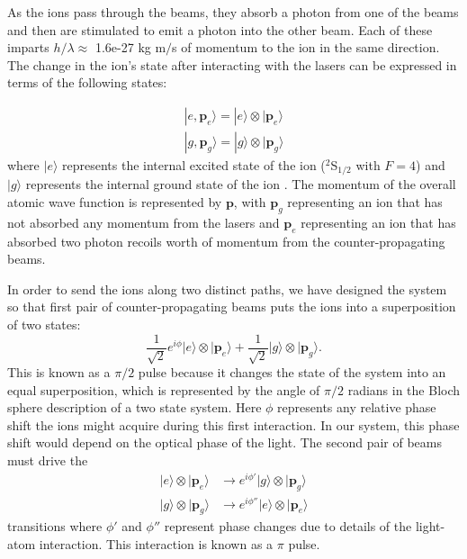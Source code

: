 As the ions pass through the beams, they absorb a photon from one of the beams and then are stimulated to emit a photon into the other beam. Each of these imparts $h/\lambda\approx$ 1.6e-27 kg m$/$s of momentum to the ion in the same direction. The change in the ion's state after interacting with the lasers can be expressed in terms of the following states: 

\begin{align}
|e,\mathbf{p}_e\rangle = |e\rangle \otimes |\mathbf{p}_e\rangle \\
|g,\mathbf{p}_g\rangle = |g\rangle \otimes |\mathbf{p}_g\rangle
\end{align} 
where $|e\rangle$ represents the internal excited state of the ion ($^2$S$_{1/2}$ with $F=4$) and $|g\rangle$ represents the internal ground state of the ion \cite{Young1997363}.
 The momentum of the overall atomic wave function is represented by $\mathbf{p}$, with $\mathbf{p}_g$ representing an ion that has not absorbed any momentum from the lasers and $\mathbf{p}_e$ representing an ion that has absorbed two photon recoils worth of momentum from the counter-propagating beams. 

In order to send the ions along two distinct paths, we have designed the system so that first pair of counter-propagating beams puts the ions into a superposition of two states:
\begin{equation}
\frac{1}{\sqrt{2}}e^{i\phi} |e\rangle \otimes |\mathbf{p}_e\rangle +
\frac{1}{\sqrt{2}} |g\rangle \otimes |\mathbf{p}_g\rangle.
\end{equation}
This is known as a $\pi/2$ pulse because it changes the state of the system into an equal superposition, which is represented by the angle of $\pi/2$ radians in the Bloch sphere description of a two state system.
Here $\phi$ represents any relative phase shift the ions might acquire during this first interaction. In our system, this phase shift would depend on the optical phase of the light. The second pair of beams must drive the 
\begin{align}
|e\rangle \otimes |\mathbf{p}_e\rangle &\rightarrow e^{i\phi'} |g\rangle \otimes |\mathbf{p}_g\rangle \\
|g\rangle \otimes |\mathbf{p}_g\rangle & \rightarrow e^{i\phi''}|e\rangle \otimes |\mathbf{p}_e\rangle 
\end{align} 
transitions where $\phi'$ and $\phi''$ represent phase changes due to details of the light-atom interaction. This interaction is known as a $\pi$ pulse.

